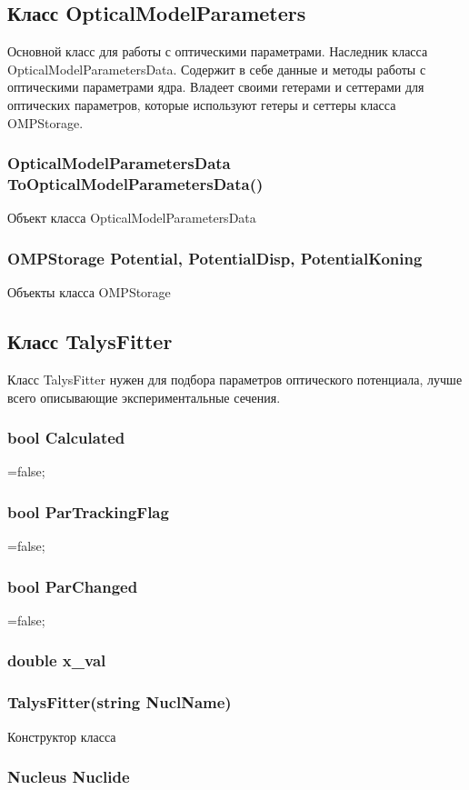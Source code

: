 \documentclass[a4paper,12pt]{extarticle}
\begin{document}
\subsection{Класс OpticalModelParameters}
Основной класс для работы с оптическими параметрами. Наследник класса OpticalModelParametersData. Содержит в себе данные и методы работы с оптическими параметрами ядра. Владеет своими гетерами и сеттерами для оптических параметров, которые используют гетеры и сеттеры класса OMPStorage.
\subsubsection{OpticalModelParametersData ToOpticalModelParametersData()}
Объект класса OpticalModelParametersData
\subsubsection{OMPStorage Potential, PotentialDisp, PotentialKoning}
Объекты класса OMPStorage
\subsection{Класс TalysFitter}
Класс TalysFitter нужен для подбора параметров оптического потенциала, лучше всего описывающие экспериментальные сечения. 
\subsubsection{bool Calculated}
=false;
\subsubsection{bool ParTrackingFlag}
=false;
\subsubsection{bool ParChanged}
=false;
\subsubsection{double x_val}

\subsubsection{TalysFitter(string NuclName)}
Конструктор класса
\subsubsection{Nucleus Nuclide}
\end{document}
